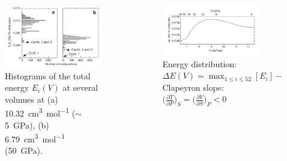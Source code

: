 \documentclass[13pt,aspectratio=169]{beamer}
\begin{document}
\begin{frame}[allowframebreaks]{\subsecname}
	\begin{columns}
		\begin{column}{0.45\textwidth}
			\begin{figure}
				\includegraphics[width=\columnwidth]{images/deltae}%
				\caption{Histograms of the total energy $E_i(V)$ at several volumes at
					(a) \SI{10.32}{\cubic\centi\meter\per\mol} ($\sim$\SI{5}{\giga\pascal}),
					(b) \SI{6.79}{\cubic\centi\meter\per\mol} (\SI{50}{\giga\pascal}).}
			\end{figure}
		\end{column}

		\begin{column}{0.45\textwidth}
			\begin{figure}
				\includegraphics[width=\columnwidth]{images/dltevsp}%
				\caption{Energy distribution: $\Delta E(V) = \max_{1 \leq i \leq 52}[E_i] - \min_{1 \leq i \leq 52}[E_i]$\\
					Clapeyron slope: $\Big( \frac{ \partial T }{ \partial P } \Big)_{ S } = \Big( \frac{ \partial V }{ \partial S } \Big)_{ P } < 0$}
			\end{figure}
		\end{column}
	\end{columns}
\end{frame}
\end{document}
